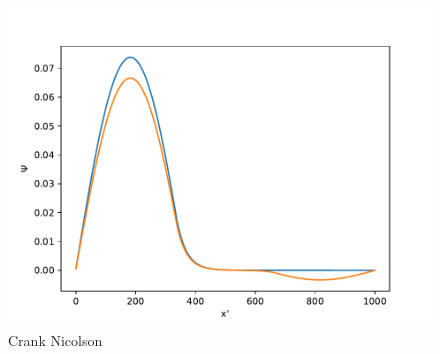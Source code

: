 \documentclass{article}
\begin{document}
\begin{figure}
    \includegraphics[width=\linewidth]{./media/crank_nicolson.pdf}
    \caption{Crank Nicolson}
    \label{fig:crank-nicolson}
\end{figure}
\end{document}
